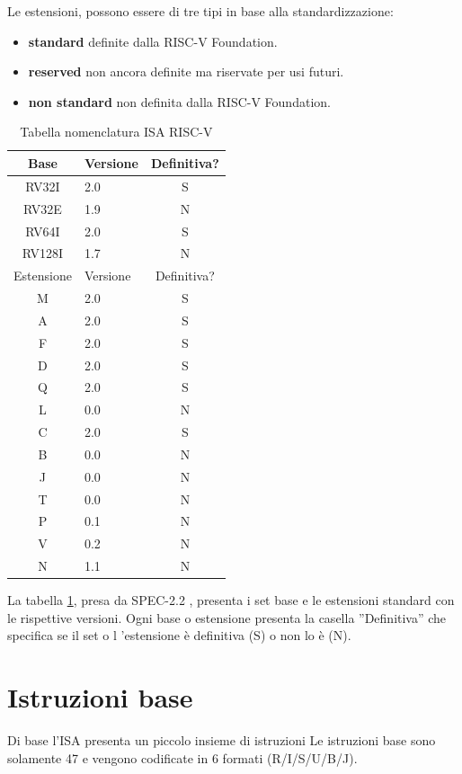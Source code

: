 \documentclass[12pt,a4paper]{report}
\begin{document}
Le estensioni, possono essere di tre tipi in base alla standardizzazione:
\begin{itemize}
	\item \textbf{standard} definite dalla RISC-V Foundation.
	\item \textbf{reserved} non ancora definite ma riservate per usi futuri.
	\item \textbf{non standard} non definita dalla RISC-V Foundation.
\end{itemize}

\begin{table}
\centering
\begin{tabular}{|c|l|c|}
\hline
Base & Versione & Definitiva? \\
\hline
RV32I & 2.0 & S\\
RV32E & 1.9 & N\\
RV64I & 2.0 & S\\
RV128I & 1.7 & N\\
\hline
Estensione & Versione & Definitiva? \\
\hline
M & 2.0 & S\\
A & 2.0 & S\\
F & 2.0 & S\\
D & 2.0 & S\\
Q & 2.0 & S\\
L & 0.0 & N\\
C & 2.0 & S\\
B & 0.0 & N\\
J & 0.0 & N\\
T & 0.0 & N \\
P & 0.1 & N\\
V & 0.2 & N\\
N & 1.1 & N\\
\hline

\end{tabular}
	\caption{Tabella nomenclatura ISA RISC-V}
	\label{tab:nomenclaturaISA}
\end{table}

La tabella  \ref{tab:nomenclaturaISA}, presa da SPEC-2.2 ,  presenta i set base e le estensioni standard con le rispettive versioni. Ogni base o estensione presenta la casella ''Definitiva'' che specifica se il set o l 'estensione è definitiva (S) o non lo è (N).




\section{Istruzioni base}
Di base l'ISA presenta un piccolo insieme di istruzioni  Le istruzioni base sono solamente 47 e vengono codificate in 6 formati (R/I/S/U/B/J).  
\end{document}
